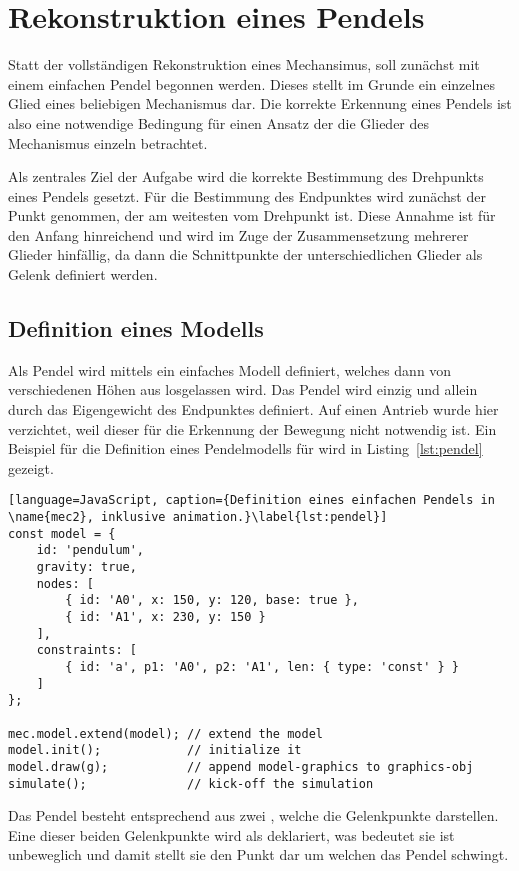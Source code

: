 \chapter{Rekonstruktion eines Pendels}

Statt der vollständigen Rekonstruktion eines Mechansimus, soll zunächst mit einem einfachen Pendel begonnen werden.
Dieses stellt im Grunde ein einzelnes Glied eines beliebigen Mechanismus dar. Die korrekte Erkennung eines Pendels ist also eine notwendige Bedingung für einen Ansatz der die Glieder des Mechanismus einzeln betrachtet.

Als zentrales Ziel der Aufgabe wird die korrekte Bestimmung des Drehpunkts eines Pendels gesetzt.
Für die Bestimmung des Endpunktes wird zunächst der Punkt genommen, der am weitesten vom Drehpunkt ist.
Diese Annahme ist für den Anfang hinreichend und wird im Zuge der Zusammensetzung mehrerer Glieder hinfällig, da dann die Schnittpunkte der unterschiedlichen Glieder als Gelenk definiert werden.

\section{Definition eines  Modells}

Als Pendel wird mittels  ein einfaches Modell definiert, welches dann von verschiedenen Höhen aus losgelassen wird.
Das Pendel wird einzig und allein durch das Eigengewicht des Endpunktes definiert.
Auf einen Antrieb wurde hier verzichtet, weil dieser für die Erkennung der Bewegung nicht notwendig ist.
Ein Beispiel für die Definition eines Pendelmodells für  wird in Listing~\ref{lst:pendel} gezeigt.

\begin{lstlisting}[language=JavaScript, caption={Definition eines einfachen Pendels in \name{mec2}, inklusive animation.}\label{lst:pendel}]
const model = {
    id: 'pendulum',
    gravity: true,
    nodes: [
        { id: 'A0', x: 150, y: 120, base: true },
        { id: 'A1', x: 230, y: 150 }
    ],
    constraints: [
        { id: 'a', p1: 'A0', p2: 'A1', len: { type: 'const' } }
    ]
};

mec.model.extend(model); // extend the model
model.init();            // initialize it
model.draw(g);           // append model-graphics to graphics-obj
simulate();              // kick-off the simulation
\end{lstlisting}

Das Pendel besteht entsprechend aus zwei , welche die Gelenkpunkte darstellen.
Eine dieser beiden Gelenkpunkte wird als  deklariert, was bedeutet sie ist unbeweglich und damit stellt sie den Punkt dar um welchen das Pendel schwingt.


